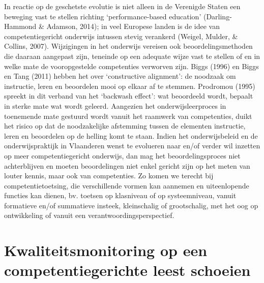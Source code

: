 \documentclass[
  letterpaper,
]{report}
\begin{document}
In reactie op de geschetste evolutie is niet alleen in de Verenigde
Staten een beweging vast te stellen richting `performance-based
education' (Darling-Hammond \& Adamson, 2014); in veel Europese landen
is de idee van competentiegericht onderwijs intussen stevig verankerd
(Weigel, Mulder, \& Collins, 2007). Wijzigingen in het onderwijs
vereisen ook beoordelingsmethoden die daaraan aangepast zijn, teneinde
op een adequate wijze vast te stellen of en in welke mate de
vooropgestelde competenties verworven zijn. Biggs (1996) en Biggs en
Tang (2011) hebben het over `constructive alignment': de noodzaak om
instructie, leren en beoordelen mooi op elkaar af te stemmen. Prodromou
(1995) spreekt in dit verband van het `backwash effect': wat beoordeeld
wordt, bepaalt in sterke mate wat wordt geleerd. Aangezien het
onderwijsleerproces in toenemende mate gestuurd wordt vanuit het
raamwerk van competenties, duikt het risico op dat de noodzakelijke
afstemming tussen de elementen instructie, leren en beoordelen op de
helling komt te staan. Indien het onderwijsbeleid en de
onderwijspraktijk in Vlaanderen wenst te evolueren naar en/of verder wil
inzetten op meer competentiegericht onderwijs, dan mag het
beoordelingsproces niet achterblijven en moeten beoordelingen niet enkel
gericht zijn op het meten van louter kennis, maar ook van competenties.
Zo komen we terecht bij competentietoetsing, die verschillende vormen
kan aannemen en uiteenlopende functies kan dienen, bv. toetsen op
klasniveau of op systeemniveau, vanuit formatieve en/of summatieve
insteek, kleinschalig of grootschalig, met het oog op ontwikkeling of
vanuit een verantwoordingsperspectief.

\hypertarget{kwaliteitsmonitoring-op-een-competentiegerichte-leest-schoeien}{%
\section{Kwaliteitsmonitoring op een competentiegerichte leest
schoeien}\label{kwaliteitsmonitoring-op-een-competentiegerichte-leest-schoeien}}
\end{document}
